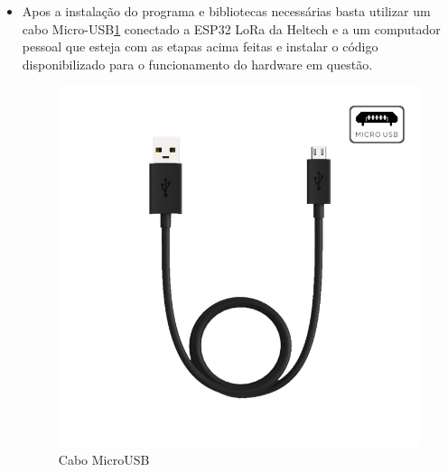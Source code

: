 \begin{itemize}
\item Apos a instalação do programa e bibliotecas necessárias basta utilizar um cabo Micro-USB\ref{fig:Cabo MicroUSB}  conectado a ESP32 LoRa da Heltech e a um computador pessoal que esteja com as etapas acima feitas e instalar o código disponibilizado para o funcionamento do hardware em questão.
   \begin{figure}[H]
  \centering
  \includegraphics[scale=0.4]{Figuras/25.carregador-image-usb.png}
  \caption{Cabo MicroUSB}
  \label{fig:Cabo MicroUSB}
\end{figure}

    
\end{itemize}